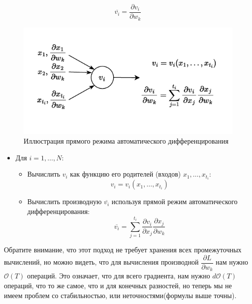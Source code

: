\documentclass[
  russian,
  letterpaper,
  DIV=11,
  numbers=noendperiod]{scrartcl}
\providecommand{\tightlist}{%
  \setlength{\itemsep}{0pt}\setlength{\parskip}{0pt}}
\begin{document}
\[
\overline{v_i} = \dfrac{\partial v_i}{\partial w_k}
\]

\begin{figure}[H]

{\centering \includegraphics[width=0.8\linewidth,height=\textheight,keepaspectratio]{auto_diff_forward.pdf}

}

\caption{Иллюстрация прямого режима автоматического дифференцирования}

\end{figure}%

\begin{itemize}
\tightlist
\item
  Для \(i = 1, \ldots, N\):

  \begin{itemize}
  \tightlist
  \item
    Вычислить \(v_i\) как функцию его родителей (входов)
    \(x_1, \ldots, x_{t_i}\): \[
      v_i = v_i(x_1, \ldots, x_{t_i})
      \]
  \item
    Вычислить производную \(\overline{v_i}\) используя прямой режим
    автоматического дифференцирования: \[
      \overline{v_i} = \sum_{j = 1}^{t_i}\dfrac{\partial v_i}{\partial x_j}\dfrac{\partial x_j}{\partial w_k}
      \]
  \end{itemize}
\end{itemize}

Обратите внимание, что этот подход не требует хранения всех
промежуточных вычислений, но можно видеть, что для вычисления
производной \(\dfrac{\partial L}{\partial w_k}\) нам нужно
\(\mathcal{O}(T)\) операций. Это означает, что для всего градиента, нам
нужно \(d\mathcal{O}(T)\) операций, что то же самое, что и для конечных
разностей, но теперь мы не имеем проблем со стабильностью, или
неточностями(формулы выше точны).

\subsection{}\label{section-2}
\end{document}
